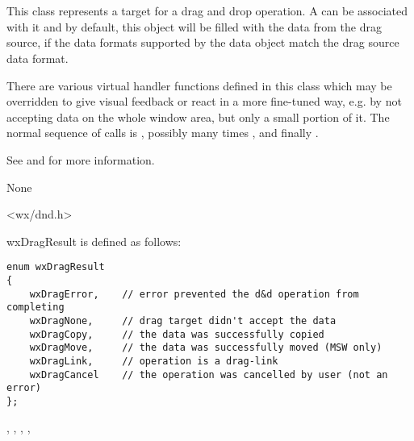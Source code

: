 \section{}\label{wxdroptarget}

This class represents a target for a drag and drop operation. A 
can be associated with it and by default, this object will be filled with the data from the
drag source, if the data formats supported by the data object match the drag source data 
format.

There are various virtual handler functions defined in this class which may be overridden
to give visual feedback or react in a more fine-tuned way, e.g. by not accepting data on
the whole window area, but only a small portion of it. The normal sequence of calls is
, possibly many times ,
 and finally .

See  and 
for more information.


None


<wx/dnd.h>


wxDragResult is defined as follows:

\begin{verbatim}
enum wxDragResult
{
    wxDragError,    // error prevented the d&d operation from completing
    wxDragNone,     // drag target didn't accept the data
    wxDragCopy,     // the data was successfully copied
    wxDragMove,     // the data was successfully moved (MSW only)
    wxDragLink,     // operation is a drag-link
    wxDragCancel    // the operation was cancelled by user (not an error)
};
\end{verbatim}


, 
, ,
, 


\label{wxdroptargetwxdroptarget}

